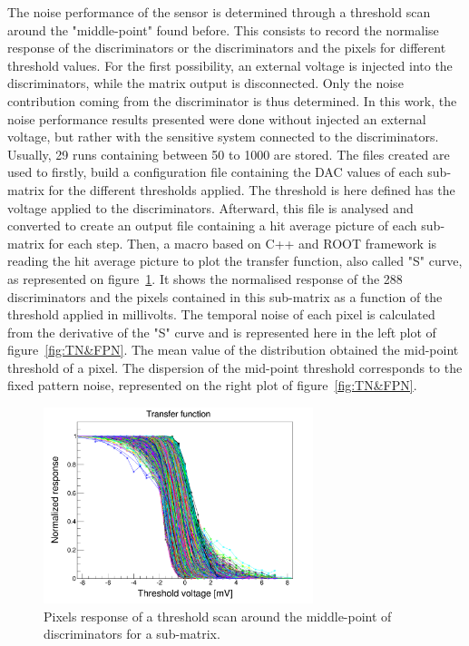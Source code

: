   The noise performance of the sensor is determined through a threshold scan around the "middle-point" found before.
  This consists to record the normalise response of the discriminators or the discriminators and the pixels for different threshold values.
  For the first possibility, an external voltage is injected into the discriminators, while the matrix output is disconnected.
  Only the noise contribution coming from the discriminator is thus determined.
  In this work, the noise performance results presented were done without injected an external voltage, but rather with the sensitive system connected to the discriminators.
  Usually, 29 runs containing between 50 to 1000 are stored.
  The files created are used to firstly, build a configuration file containing the DAC values of each sub-matrix for the different thresholds applied.
  The threshold is here defined has the voltage applied to the discriminators.
  Afterward, this file is analysed and converted to create an output file containing a hit average picture of each sub-matrix for each step.
  Then, a macro based on C++ and ROOT framework is reading the hit average picture to plot the transfer function, also called "S" curve, as represented on figure~\ref{fig:transfer}.
  It shows the normalised response of the 288 discriminators and the pixels contained in this sub-matrix as a function of the threshold applied in millivolts.
  The temporal noise of each pixel is calculated from the derivative of the "S" curve and is represented here in the left plot of figure~\ref{fig:TN&FPN}.
  The mean value of the distribution obtained the mid-point threshold of a pixel.
  The dispersion of the mid-point threshold corresponds to the fixed pattern noise, represented on the right plot of figure~\ref{fig:TN&FPN}.
  
  \begin{figure}[!h]
    \centering
    \includegraphics[width=0.7\textwidth]{Pictures/labTests/transfer_B.png}
    \caption{Pixels response of a threshold scan around the middle-point of discriminators for a sub-matrix.}
    \label{fig:transfer}
  \end{figure}

